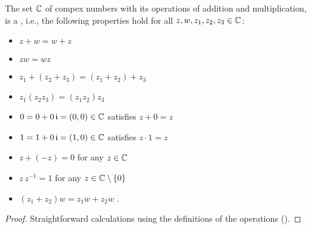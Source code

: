 \begin{theorem}
  \label{thm:complex_number_field}

  The set $\mathbb{C}$ of compex numbers with its operations of addition and multiplication,
  is a , i.e., the following properties hold for
  all $z, w, z_1, z_2, z_3 \in \mathbb{C}$:
  \begin{itemize}
    \item $z + w = w + z$ 
    \item $z w = w z$ 
    \item $z_1 + (z_2 + z_3) = (z_1 + z_2) + z_3$ 
    \item $z_1 (z_2 z_3) = (z_1 z_2) z_3$ 
    \item $0 = 0 + 0 \, \mathfrak{i} = (0,0) \in \mathbb{C}$ satisfies $z + 0 = z$
    \item $1 = 1 + 0 \, \mathfrak{i} = (1,0) \in \mathbb{C}$ satisfies $z \cdot 1= z$
    \item %
          $z + (-z) = 0$ for any $z \in \mathbb{C}$ 
    \item %
          $z \, z^{-1} = 1$ for any $z \in \mathbb{C} \setminus \left\{ 0 \right\}$ 
    \item $(z_1 + z_2) w = z_1 w + z_2 w$ .
  \end{itemize}
\end{theorem}
\begin{proof}
  Straightforward calculations using the definitions of the operations
  ().
\end{proof}
